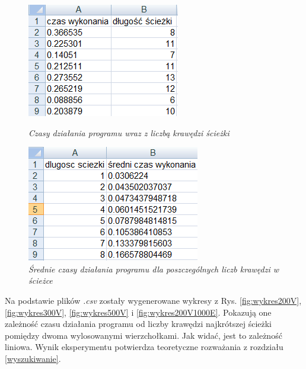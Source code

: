 \documentclass[a4paper, 12pt]{article}
\begin{document}
\begin{figure}[ht]
\begin{minipage}[b]{0.41\linewidth}
\centering
\includegraphics[width=\textwidth]{tabela1.png}
\caption{\em Czasy działania programu wraz z liczbą krawędzi ścieżki}
\label{fig:tabela1}
\end{minipage}
\hspace{0.5cm}
\begin{minipage}[b]{0.45\linewidth}
\centering
\includegraphics[width=\textwidth]{tabela2.png}
\caption{\em Średnie czasy działania programu dla poszczególnych liczb krawędzi w ścieżce}
\label{fig:tabela2}
\end{minipage}
\end{figure}

Na podstawie plików {\it *.csv} zostały wygenerowane wykresy z Rys. \ref{fig:wykres200V}, \ref{fig:wykres300V}, \ref{fig:wykres500V} i \ref{fig:wykres200V1000E}. Pokazują one zależność czasu działania programu od liczby krawędzi najkrótszej ścieżki pomiędzy dwoma wylosowanymi wierzchołkami. Jak widać, jest to zależność liniowa. Wynik eksperymentu potwierdza teoretyczne rozważania z rozdziału \ref{wyszukiwanie}.
\end{document}
